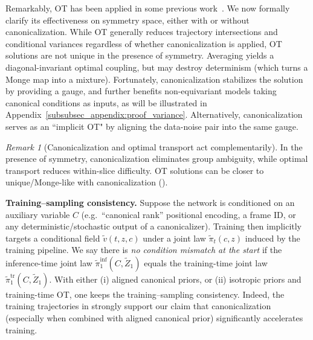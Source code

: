 \documentclass{article}
\theoremstyle{plain}
\theoremstyle{definition}
\newtheorem{definition}[theorem]{Definition}
\theoremstyle{remark}
\newtheorem{remark}[theorem]{Remark}
\newcommand{\1}{\mathbf{1}}
\begin{document}
Remarkably, OT has been applied in some previous work~\citep{irwin2024semlaflow}. We now formally clarify its effectiveness on symmetry space, either with or without canonicalization. While OT generally reduces trajectory intersections and conditional variances regardless of whether canonicalization is applied, OT solutions are not unique in the presence of symmetry.
Averaging yields a diagonal-invariant optimal coupling, but may destroy determinism (which turns a Monge map into a mixture).
Fortunately, canonicalization stabilizes the solution by providing a gauge, and further benefits non-equivariant models taking canonical conditions as inputs, as will be illustrated in Appendix~\ref{subsubsec_appendix:proof_variance}. Alternatively, canonicalization serves as an ``implicit OT" by aligning the data-noise pair into the same gauge.
\begin{remark}[Canonicalization and optimal transport act complementarily]
    In the presence of symmetry, canonicalization eliminates group ambiguity, while optimal transport reduces within-slice difficulty. OT solutions can be closer to unique/Monge-like with canonicalization ().
\end{remark}
\textbf{Training--sampling consistency.}
Suppose the network is conditioned on an auxiliary variable $C$ (e.g.\ ``canonical rank'' positional encoding, a frame ID, or any deterministic/stochastic output of a canonicalizer).
Training then implicitly targets a conditional field $\widetilde v(t,z,c)$ under a joint law $\tilde\pi_t(c,z)$ induced by the training pipeline.
We say there is \emph{no condition mismatch at the start} if the inference-time joint law $\tilde\pi^{\mathrm{inf}}_1(C,\widetilde Z_1)$ equals the training-time joint law $\tilde\pi^{\mathrm{tr}}_1(C,\widetilde Z_1)$.
With either (i) aligned canonical priors, or (ii) isotropic priors and training-time OT, one keeps the training--sampling consistency. Indeed, the training trajectories in  strongly support our claim that canonicalization (especially when combined with aligned canonical prior) significantly accelerates training. 
\end{document}
